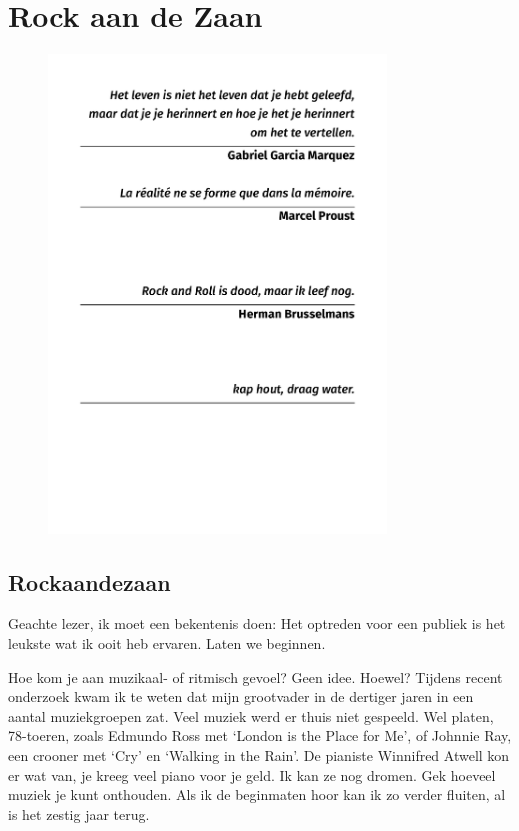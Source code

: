 \documentclass[10pt,twoside, openright]{memoir}
\begin{document}
\clearpage
~
\clearpage
\chapter{Rock aan de Zaan}

\thispagestyle{empty}
\begin{flushright}
\begin{figure}
\includegraphics[width=0.8\textwidth, right]{img/epi/epi3}
\end{figure}
\end{flushright}

\section{Rockaandezaan}


\noindent Geachte lezer, ik moet een bekentenis doen: Het optreden voor een publiek is het leukste wat ik ooit heb ervaren. Laten we beginnen.

Hoe kom je aan muzikaal- of ritmisch gevoel? Geen idee. Hoewel? Tijdens recent onderzoek kwam ik te weten dat mijn grootvader in de dertiger jaren in een aantal muziekgroepen zat. Veel muziek werd er thuis niet gespeeld. Wel platen, 78-toeren, zoals Edmundo Ross met `London is the Place for Me', of Johnnie Ray, een crooner met `Cry' en `Walking in the Rain'. De pianiste Winnifred Atwell kon er wat van, je kreeg veel piano voor je geld. Ik kan ze nog dromen. Gek hoeveel muziek je kunt onthouden. Als ik de beginmaten hoor kan ik zo verder fluiten, al is het zestig jaar terug. 
\end{document}
